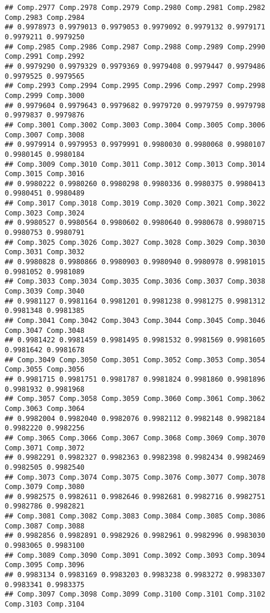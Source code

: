 \documentclass[
]{article}
\begin{document}
\begin{verbatim}
## Comp.2977 Comp.2978 Comp.2979 Comp.2980 Comp.2981 Comp.2982 Comp.2983 Comp.2984 
## 0.9978973 0.9979013 0.9979053 0.9979092 0.9979132 0.9979171 0.9979211 0.9979250 
## Comp.2985 Comp.2986 Comp.2987 Comp.2988 Comp.2989 Comp.2990 Comp.2991 Comp.2992 
## 0.9979290 0.9979329 0.9979369 0.9979408 0.9979447 0.9979486 0.9979525 0.9979565 
## Comp.2993 Comp.2994 Comp.2995 Comp.2996 Comp.2997 Comp.2998 Comp.2999 Comp.3000 
## 0.9979604 0.9979643 0.9979682 0.9979720 0.9979759 0.9979798 0.9979837 0.9979876 
## Comp.3001 Comp.3002 Comp.3003 Comp.3004 Comp.3005 Comp.3006 Comp.3007 Comp.3008 
## 0.9979914 0.9979953 0.9979991 0.9980030 0.9980068 0.9980107 0.9980145 0.9980184 
## Comp.3009 Comp.3010 Comp.3011 Comp.3012 Comp.3013 Comp.3014 Comp.3015 Comp.3016 
## 0.9980222 0.9980260 0.9980298 0.9980336 0.9980375 0.9980413 0.9980451 0.9980489 
## Comp.3017 Comp.3018 Comp.3019 Comp.3020 Comp.3021 Comp.3022 Comp.3023 Comp.3024 
## 0.9980527 0.9980564 0.9980602 0.9980640 0.9980678 0.9980715 0.9980753 0.9980791 
## Comp.3025 Comp.3026 Comp.3027 Comp.3028 Comp.3029 Comp.3030 Comp.3031 Comp.3032 
## 0.9980828 0.9980866 0.9980903 0.9980940 0.9980978 0.9981015 0.9981052 0.9981089 
## Comp.3033 Comp.3034 Comp.3035 Comp.3036 Comp.3037 Comp.3038 Comp.3039 Comp.3040 
## 0.9981127 0.9981164 0.9981201 0.9981238 0.9981275 0.9981312 0.9981348 0.9981385 
## Comp.3041 Comp.3042 Comp.3043 Comp.3044 Comp.3045 Comp.3046 Comp.3047 Comp.3048 
## 0.9981422 0.9981459 0.9981495 0.9981532 0.9981569 0.9981605 0.9981642 0.9981678 
## Comp.3049 Comp.3050 Comp.3051 Comp.3052 Comp.3053 Comp.3054 Comp.3055 Comp.3056 
## 0.9981715 0.9981751 0.9981787 0.9981824 0.9981860 0.9981896 0.9981932 0.9981968 
## Comp.3057 Comp.3058 Comp.3059 Comp.3060 Comp.3061 Comp.3062 Comp.3063 Comp.3064 
## 0.9982004 0.9982040 0.9982076 0.9982112 0.9982148 0.9982184 0.9982220 0.9982256 
## Comp.3065 Comp.3066 Comp.3067 Comp.3068 Comp.3069 Comp.3070 Comp.3071 Comp.3072 
## 0.9982291 0.9982327 0.9982363 0.9982398 0.9982434 0.9982469 0.9982505 0.9982540 
## Comp.3073 Comp.3074 Comp.3075 Comp.3076 Comp.3077 Comp.3078 Comp.3079 Comp.3080 
## 0.9982575 0.9982611 0.9982646 0.9982681 0.9982716 0.9982751 0.9982786 0.9982821 
## Comp.3081 Comp.3082 Comp.3083 Comp.3084 Comp.3085 Comp.3086 Comp.3087 Comp.3088 
## 0.9982856 0.9982891 0.9982926 0.9982961 0.9982996 0.9983030 0.9983065 0.9983100 
## Comp.3089 Comp.3090 Comp.3091 Comp.3092 Comp.3093 Comp.3094 Comp.3095 Comp.3096 
## 0.9983134 0.9983169 0.9983203 0.9983238 0.9983272 0.9983307 0.9983341 0.9983375 
## Comp.3097 Comp.3098 Comp.3099 Comp.3100 Comp.3101 Comp.3102 Comp.3103 Comp.3104 

\end{verbatim}
\end{document}
